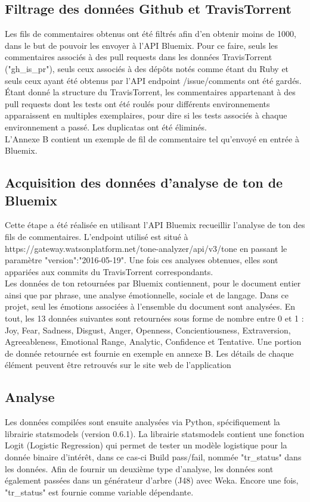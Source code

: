 \documentclass[10pt, conference]{IEEEtran}
\begin{document}
\subsection{Filtrage des données Github et TravisTorrent}
Les fils de commentaires obtenus ont été filtrés afin d’en obtenir moins de 1000, dans le but de pouvoir les envoyer à l’API Bluemix. Pour ce faire, seuls les commentaires associés à des pull requests dans les données TravisTorrent ("gh\_is\_pr"), seuls ceux associés à des dépôts notés comme étant du Ruby et seuls ceux ayant été obtenus par l’API endpoint /issue/comments ont été gardés. Étant donné la structure du TravisTorrent, les commentaires appartenant à des pull requests dont les tests ont été roulés pour différents environnements apparaissent en multiples exemplaires, pour dire si les tests associés à chaque environnement a passé. Les duplicatas ont été éliminés. \\
L’Annexe B contient un exemple de fil de commentaire tel qu’envoyé en entrée à Bluemix.

\subsection{Acquisition des données d’analyse de ton de Bluemix} 
Cette étape a été réalisée en utilisant l’API Bluemix recueillir l’analyse de ton des fils de commentaires. L’endpoint utilisé est situé à https://gateway.watsonplatform.net/tone-analyzer/api/v3/tone en passant le paramètre "version":"2016-05-19". Une fois ces analyses obtenues, elles sont appariées aux commits du TravisTorrent correspondants. \\
Les données de ton retournées par Bluemix contiennent, pour le document entier ainsi que par phrase, une analyse émotionnelle, sociale et de langage. Dans ce projet, seul les émotions associées à l'ensemble du document sont analysées. En tout, les 13 données suivantes sont retournées sous forme de nombre entre 0 et 1 : Joy, Fear, Sadness, Disgust, Anger, Openness, Concientiousness, Extraversion, Agreeableness, Emotional Range, Analytic, Confidence et Tentative. Une portion de donnée retournée est fournie en exemple en annexe B. Les détails de chaque élément peuvent être retrouvés sur le site web de l'application \cite{c1}

\subsection{Analyse}
Les données compilées sont ensuite analysées via Python, spécifiquement la librairie statsmodels (version 0.6.1). La librairie statsmodels contient une fonction Logit (Logistic Regression) qui permet de tester un modèle logistique pour la donnée binaire d’intérêt, dans ce cas-ci Build pass/fail, nommée "tr\_status" dans les données.
Afin de fournir un deuxième type d’analyse, les données sont également passées dans un générateur d’arbre (J48) avec Weka. Encore une fois, "tr\_status" est fournie comme variable dépendante. 
\end{document}
